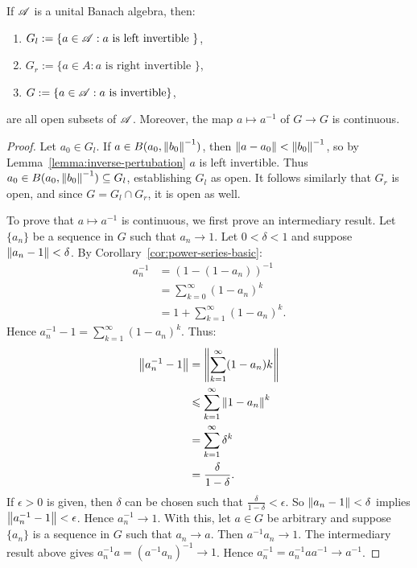 \documentclass[reqno]{amsart}
\begin{document}
\begin{theorem}
	If $\mathscr{A}$ is a unital Banach algebra, then:
	\mbox{}
	\begin{enumerate}[label = (\roman*),itemsep=1pt,topsep=3pt]
		\item $G_l := \{a \in \mathscr{A} : a \text{ is left invertible }\}$,
		\item $G_r := \{a \in A: a \text{ is right invertible }\}$,
		\item $G := \{a \in \mathscr{A} : a \text{ is invertible}\}$,
	\end{enumerate}
	are all open subsets of $\mathscr{A}$. Moreover, the map $a \mapsto a ^{-1}$ of $G \rightarrow G$ is continuous.
\end{theorem}
	\begin{proof}
		Let $a_0 \in G_l$. If $a \in B(a_0, \left\lVert b_0 \right\rVert^{-1})$, then $\left\lVert a-a_0 \right\rVert < \left\lVert b_0 \right\rVert^{-1}$, so by Lemma~\ref{lemma:inverse-pertubation} $a$ is left invertible. Thus $a_0 \in B(a_0,\left\lVert b_0 \right\rVert^{-1}) \subseteq G_l$, establishing $G_l$ as open. It follows similarly that $G_r$ is open, and since $G = G_l \cap G_r$, it is open as well. 

		To prove that $a \mapsto a^{-1}$ is continuous, we first prove an intermediary result. Let $\{a_n\}$ be a sequence in $G$ such that $a_n \rightarrow 1$. Let $0 < \delta <1$ and suppose $\left\lVert a_n - 1 \right\rVert < \delta$. By Corollary~\ref{cor:power-series-basic}:
		\begin{align*}
			a_n^{-1}
			&= (1-(1-a_n))^{-1} \\
			&= \sum_{k=0}^{\infty} (1-a_n)^k \\
			&= 1+ \sum_{k=1}^{\infty} (1-a_n)^k.
		\end{align*}
		Hence $a_n^{-1} - 1 = \sum_{k=1}^{\infty} (1-a_n)^k$. Thus:
		\begin{align*}
			\left\lVert a_n^{-1} - 1 \right\rVert
			&= \left\lVert \sum_{k=1}^{\infty} (1-a_n)k \right\rVert \\
			&\leqslant \sum_{k=1}^{\infty} \left\lVert 1-a_n \right\rVert^k \\
			&= \sum_{k=1}^{\infty} \delta^k \\
			&= \frac{\delta}{1-\delta}. 
		\end{align*}
		If $\epsilon > 0$ is given, then $\delta$ can be chosen such that $\frac{\delta}{1-\delta} < \epsilon$. So $\left\lVert a_n - 1 \right\rVert < \delta$ implies $\left\lVert a_n^{-1} - 1 \right\rVert < \epsilon$. Hence $a_n^{-1} \rightarrow 1$.
		With this, let $a \in G$ be arbitrary and suppose $\{a_n\}$ is a sequence in $G$ such that $a_n \rightarrow a$. Then $a^{-1}a_n \rightarrow 1$. The intermediary result above gives $a_n^{-1}a = (a^{-1}a_n)^{-1} \rightarrow 1$. Hence $a_n^{-1} = a_n^{-1}aa^{-1} \rightarrow a^{-1}$.
	\end{proof}
\end{document}
